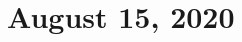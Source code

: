 \documentclass[10pt,letterpaper]{article}
\begin{document}
\section*{August 15, 2020}
\begin{multicols*}{3}
\newgame
\begin{figure}[H]
\\
\scalebox{.8}{\showboard}
\end{figure}
\begin{figure}[H]
\\
\scalebox{.8}{\showboard}
\end{figure}
\begin{figure}[H]
\\
\scalebox{.8}{\showboard}
\end{figure}
\begin{figure}[H]
\\
\scalebox{.8}{\showboard}
\end{figure}
\begin{figure}[H]
\\
\scalebox{.8}{\showboard}
\end{figure}
\begin{figure}[H]
\\
\scalebox{.8}{\showboard}
\end{figure}
\end{multicols*}
\end{document}
